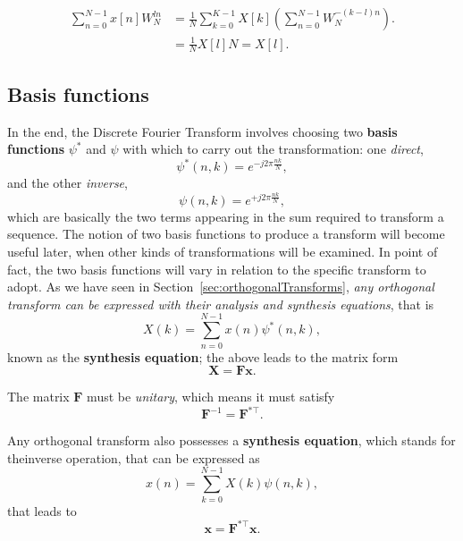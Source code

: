 \documentclass[\documentfontsize, twocolumn]{\classname}
\begin{document}
\begin{align*}
    \sum_{n=0}^{N-1} x[n] W_N^{ln}
    &= \frac 1 N \sum_{k=0}^{K-1} X[k] \left(\sum_{n=0}^{N-1}W_N^{-(k-l)n}\right).\\
    &= \frac 1 N X[l] N = X[l].
\end{align*}

\subsection{Basis functions}\label{sec:basisFunctions}

In the end, the Discrete Fourier Transform involves choosing two \textbf{basis functions} $\psi^*$ and $\psi$ with which to carry out the transformation: one \emph{direct},
\[
    \psi^*(n, k) = e^{-j 2\pi \frac{nk}{N}},
\]
and the other \emph{inverse},
\[
    \psi(n, k) = e^{+j 2\pi \frac{nk}{N}},
\]
which are basically the two terms appearing in the sum required to transform a sequence. The notion of two basis functions to produce a transform will become useful later, when other kinds of transformations will be examined. In point of fact, the two basis functions will vary in relation to the specific transform to adopt. As we have seen in Section~\ref{sec:orthogonalTransforms}, \emph{any orthogonal transform can be expressed with their analysis and synthesis equations}, that is
\begin{equation}\label{eqn:analysisEquation}
    X(k) = \sum_{n=0}^{N-1} x(n)\psi^*(n, k),
\end{equation}
known as the \textbf{synthesis equation}; the above leads to the matrix form
\begin{equation}\label{eqn:analysisEquationMatrixForm}
    \bm{X} = \bm{Fx}.
\end{equation}

The matrix $\bm{F}$ must be \emph{unitary}, which means it must satisfy
\begin{equation}\label{eqn:unitaryMatrix}
    \bm{F}^{-1} = \bm{F}^{*\top}.
\end{equation}

Any orthogonal transform also possesses a \textbf{synthesis equation}, which stands for theinverse operation, that can be expressed as
\begin{equation}\label{eqn:synthesisEquation}
    x(n) = \sum_{k=0}^{N-1} X(k)\psi(n, k),
\end{equation}
that leads to
\begin{equation}\label{eqn:synthesisEquationMatrixForm}
    \bm{x} = \bm{F}^{*\top}\bm{x}.
\end{equation}
\end{document}
